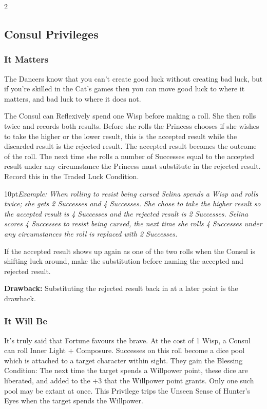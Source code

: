 \begin{multicols}{2}
\subsection*{Consul Privileges}

\subsubsection*{It Matters}

The Dancers know that you can't create good luck without creating bad luck, but if you're skilled in the Cat's games then you can move good luck to where it matters, and bad luck to where it does not. 

The Consul can Reflexively spend one Wisp before making a roll. She then rolls twice and records both results. Before she rolls the Princess chooses if she wishes to take the higher or the lower result, this is the accepted result while the discarded result is the rejected result. The accepted result becomes the outcome of the roll. The next time she rolls a number of Successes equal to the accepted result under any circumstance the Princess must substitute in the rejected result. Record this in the Traded Luck Condition.

\begin{myindentpar}{10pt}\textit{Example: When rolling to resist being cursed Selina spends a Wisp and rolls twice; she gets 2 Successes and 4 Successes. She chose to take the higher result so the accepted result is 4 Successes and the rejected result is 2 Successes. Selina scores 4 Successes to resist being cursed, the next time she rolls 4 Successes under any circumstances the roll is replaced with 2 Successes.}\end{myindentpar}

If the accepted result shows up again as one of the two rolls when the Consul is shifting luck around, make the substitution before naming the accepted and rejected result.

\textbf{Drawback:} Substituting the rejected result back in at a later point is the drawback. 

\subsubsection*{It Will Be}

It's truly said that Fortune favours the brave. At the cost of 1 Wisp, a Consul can roll Inner Light + Composure. Successes on this roll become a dice pool which is attached to a target character within sight. They gain the Blessing Condition: The next time the target spends a Willpower point, these dice are liberated, and added to the +3 that the Willpower point grants. Only one such pool may be extant at once. This Privilege trips the Unseen Sense of Hunter's Eyes when the target spends the Willpower. 


\end{multicols}
